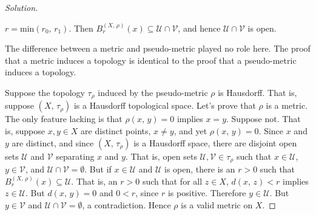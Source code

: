 \documentclass{article}
\theoremstyle{normal}
\begin{document}
\begin{proof}[Solution]
\begin{itemize}
                $r=\textrm{min}(r_{0},\,r_{1})$. Then
                $B_{r}^{(X,\,\rho)}(x)\subseteq\mathcal{U}\cap\mathcal{V}$, and
                hence $\mathcal{U}\cap\mathcal{V}$ is open.
        \end{itemize}
        The difference between a metric and pseudo-metric played no role here.
        The proof that a metric induces a topology is identical to the proof
        that a pseudo-metric induces a topology.
        \par\hfill\par
        Suppose the topology $\tau_{\rho}$ induced by the pseudo-metric
        $\rho$ is Hausdorff. That is, suppose $(X,\,\tau_{\rho})$ is a
        Hausdorff topological space. Let's prove that $\rho$ is a metric. The
        only feature lacking is that $\rho(x,\,y)=0$ implies $x=y$. Suppose not.
        That is, suppose $x,y\in{X}$ are distinct points, $x\ne{y}$, and yet
        $\rho(x,\,y)=0$. Since $x$ and $y$ are distinct, and since
        $(X,\,\tau_{\rho})$ is a Hausdorff space, there are disjoint open sets
        $\mathcal{U}$ and $\mathcal{V}$ separating $x$ and $y$. That is, open
        sets $\mathcal{U},\mathcal{V}\in\tau_{\rho}$ such that
        $x\in\mathcal{U}$, $y\in\mathcal{V}$, and
        $\mathcal{U}\cap\mathcal{V}=\emptyset$. But if $x\in\mathcal{U}$ and
        $\mathcal{U}$ is open, there is an $r>0$ such that
        $B_{r}^{(X,\,\rho)}(x)\subseteq\mathcal{U}$. That is, an $r>0$ such
        that for all $z\in{X}$, $d(x,\,z)<r$ implies $z\in\mathcal{U}$. But
        $d(x,\,y)=0$ and $0<r$, since $r$ is positive. Therefore
        $y\in\mathcal{U}$. But $y\in\mathcal{V}$ and
        $\mathcal{U}\cap\mathcal{V}=\emptyset$, a contradiction. Hence
        $\rho$ is a valid metric on $X$.
    \end{proof}
    \newpage
    \color{blue}
\end{document}
